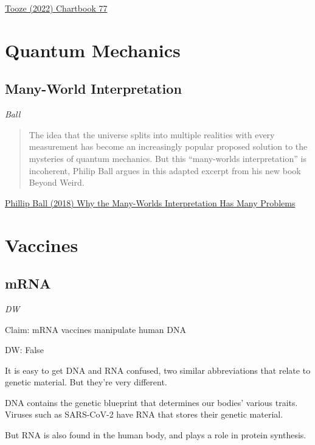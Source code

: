 \documentclass[
]{book}
\begin{document}
\href{https://adamtooze.substack.com/p/chartbook-77-more-than-7000-deaths}{Tooze (2022) Chartbook 77}

\hypertarget{quantum-mechanics}{%
\chapter{Quantum Mechanics}\label{quantum-mechanics}}

\hypertarget{many-world-interpretation}{%
\section{Many-World Interpretation}\label{many-world-interpretation}}

\emph{Ball}

\begin{quote}
The idea that the universe splits into multiple realities with every measurement has become an increasingly popular proposed solution to the mysteries of quantum mechanics. But this ``many-worlds interpretation'' is incoherent, Philip Ball argues in this adapted excerpt from his new book Beyond Weird.
\end{quote}

\href{https://www.quantamagazine.org/why-the-many-worlds-interpretation-of-quantum-mechanics-has-many-problems-20181018/}{Phillip Ball (2018) Why the Many-Worlds Interpretation Has Many Problems}

\hypertarget{vaccines}{%
\chapter{Vaccines}\label{vaccines}}

\hypertarget{mrna}{%
\section{mRNA}\label{mrna}}

\emph{DW}

Claim: mRNA vaccines manipulate human DNA

DW: False

It is easy to get DNA and RNA confused, two similar abbreviations that relate to genetic material. But they're very different.

DNA contains the genetic blueprint that determines our bodies' various traits. Viruses such as SARS-CoV-2 have RNA that stores their genetic material.

But RNA is also found in the human body, and plays a role in protein synthesis.
\end{document}
